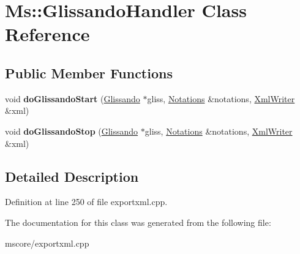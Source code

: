 \hypertarget{class_ms_1_1_glissando_handler}{}\section{Ms\+:\+:Glissando\+Handler Class Reference}
\label{class_ms_1_1_glissando_handler}
\subsection*{Public Member Functions}
\begin{DoxyCompactItemize}
\item 
\mbox{\label{class_ms_1_1_glissando_handler_a13570da3c0783c6382f8e090a5744517}} 
void {\bfseries do\+Glissando\+Start} (\hyperlink{class_ms_1_1_glissando}{Glissando} $\ast$gliss, \hyperlink{class_ms_1_1_notations}{Notations} \&notations, \hyperlink{class_ms_1_1_xml_writer}{Xml\+Writer} \&xml)
\item 
\mbox{\label{class_ms_1_1_glissando_handler_ab59f9e9b6f8dbbbddc2e510183a6937d}} 
void {\bfseries do\+Glissando\+Stop} (\hyperlink{class_ms_1_1_glissando}{Glissando} $\ast$gliss, \hyperlink{class_ms_1_1_notations}{Notations} \&notations, \hyperlink{class_ms_1_1_xml_writer}{Xml\+Writer} \&xml)
\end{DoxyCompactItemize}


\subsection{Detailed Description}


Definition at line 250 of file exportxml.\+cpp.



The documentation for this class was generated from the following file\+:\begin{DoxyCompactItemize}
\item 
mscore/exportxml.\+cpp\end{DoxyCompactItemize}
